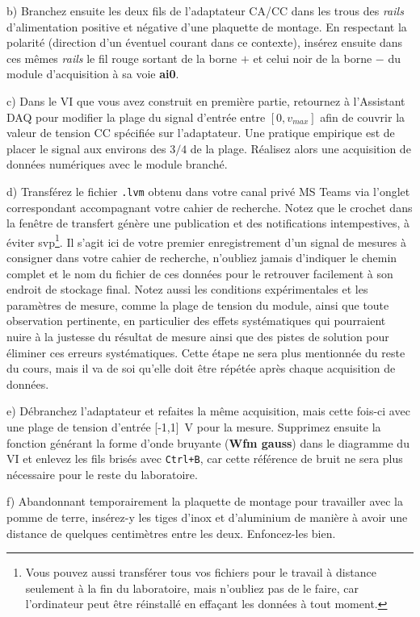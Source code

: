 \documentclass[canadien,12pt,oneside,letterpaper]{article}
\begin{document}
b) Branchez ensuite les deux fils de l'adaptateur CA/CC dans les trous des \textit{rails} d'alimentation positive et négative d'une plaquette de montage. En respectant la polarité (direction d'un éventuel courant dans ce contexte), insérez ensuite dans ces mêmes \textit{rails} le fil rouge sortant de la borne $+$ et celui noir de la borne $-$ du module d'acquisition à sa voie \textbf{ai0}.

c) Dans le VI que vous avez construit en première partie, retournez à l'Assistant DAQ pour modifier la plage du signal d'entrée entre $[0,v_{max}]$ afin de couvrir la valeur de tension CC spécifiée sur l'adaptateur. Une pratique empirique est de placer le signal aux environs des $3/4$ de la plage. Réalisez alors une acquisition de données numériques avec le module branché. 

d) Transférez le fichier \texttt{.lvm} obtenu dans votre canal privé MS Teams via l'onglet correspondant accompagnant votre cahier de recherche. Notez que le crochet dans la fenêtre de transfert génère une publication et des notifications intempestives, à éviter svp\footnote{Vous pouvez aussi transférer tous vos fichiers pour le travail à distance seulement à la fin du laboratoire, mais n'oubliez pas de le faire, car l'ordinateur peut être réinstallé en effaçant les données à tout moment.}. Il s'agit ici de votre premier enregistrement d'un signal de mesures à consigner dans votre cahier de recherche, n'oubliez jamais d'indiquer le chemin complet et le nom du fichier de ces données pour le retrouver facilement à son endroit de stockage final. Notez aussi les conditions expérimentales et les paramètres de mesure, comme la plage de tension du module, ainsi que toute observation pertinente, en particulier des effets systématiques qui pourraient nuire à la justesse du résultat de mesure ainsi que des pistes de solution pour éliminer ces erreurs systématiques. Cette étape ne sera plus mentionnée du reste du cours, mais il va de soi qu'elle doit être répétée après chaque acquisition de données.

e) Débranchez l'adaptateur et refaites la même acquisition, mais cette fois-ci avec une plage de tension d'entrée [-1,1]~V pour la mesure. Supprimez ensuite la fonction générant la forme d'onde bruyante (\textbf{Wfm gauss}) dans le diagramme du VI et enlevez les fils brisés avec \texttt{Ctrl+B}, car cette référence de bruit ne sera plus nécessaire pour le reste du laboratoire.
 
f) Abandonnant temporairement la plaquette de montage pour travailler avec la pomme de terre, insérez-y les tiges d'inox et d'aluminium de manière à avoir une distance de quelques centimètres entre les deux. Enfoncez-les bien. %
\end{document}
